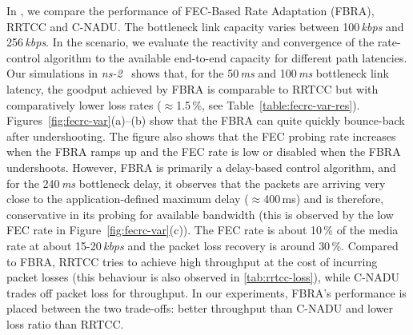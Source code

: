 In , we compare the performance of FEC-Based Rate Adaptation
(FBRA), RRTCC and C-NADU. The bottleneck link capacity varies between
100\,\emph{kbps} and 256\,\emph{kbps}. In the scenario, we evaluate the
reactivity and convergence of the rate-control algorithm to the available
end-to-end capacity for different path latencies. Our simulations in
\emph{ns-2}~\cite{ns2} shows that, for the 50\,\emph{ms} and 100\,\emph{ms}
bottleneck link latency, the goodput achieved by FBRA is comparable to RRTCC
but with comparatively lower loss rates ($\approx$1.5\,\%, see
Table~\ref{table:fecrc-var-res}). Figures~\ref{fig:fecrc-var}(a)--(b) show
that the FBRA can quite quickly bounce-back after undershooting. The figure
also shows that the FEC probing rate increases when the FBRA ramps up and the
FEC rate is low or disabled when the FBRA undershoots. However, FBRA is
primarily a delay-based control algorithm, and for the 240\,\emph{ms} bottleneck
delay, it observes that the packets are arriving very close to the
application-defined maximum delay ($\approx$400\,ms) and is therefore, conservative in its
probing for available bandwidth (this is observed by the low FEC rate in
Figure~\ref{fig:fecrc-var}(c)). The FEC rate is about 10\,\% of the media rate at
about 15-20\,\emph{kbps} and the packet loss recovery is around 30\,\%.
Compared to FBRA, RRTCC tries to achieve high throughput at the cost of
incurring packet losses (this behaviour is also observed in \ref{tab:rrtcc-loss}),
while C-NADU trades off packet loss for throughput. In our
experiments, FBRA's performance is placed between the two trade-offs: better
throughput than C-NADU and lower loss ratio than RRTCC.


